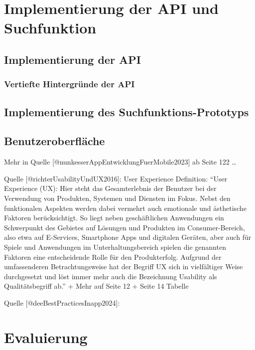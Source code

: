 \documentclass[
  12pt,
  a4paperpaper,
]{report}
\begin{document}
\chapter{Implementierung der API und
Suchfunktion}\label{implementierung-der-api-und-suchfunktion}

\section{Implementierung der API}\label{implementierung-der-api}

\subsection{Vertiefte Hintergründe der
API}\label{vertiefte-hintergruxfcnde-der-api}

\section{Implementierung des
Suchfunktions-Prototyps}\label{implementierung-des-suchfunktions-prototyps}

\section{Benutzeroberfläche}\label{benutzeroberfluxe4che}

Mehr in Quelle {[}@nunkesserAppEntwicklungFuerMobile2023{]} ab Seite 122
\ldots{}

Quelle {[}@richterUsabilityUndUX2016{]}: User Experience Definition:
``User Experience (UX): Hier steht das Gesamterlebnis der Benutzer bei
der Verwendung von Produkten, Systemen und Diensten im Fokus. Nebst den
funktionalen Aspekten werden dabei vermehrt auch emotionale und
ästhetische Faktoren berücksichtigt. So liegt neben geschäftlichen
Anwendungen ein Schwerpunkt des Gebietes auf Lösungen und Produkten im
Consumer-Bereich, also etwa auf E-Services, Smartphone Apps und
digitalen Geräten, aber auch für Spiele und Anwendungen im
Unterhaltungsbereich spielen die genannten Faktoren eine entscheidende
Rolle für den Produkterfolg. Aufgrund der umfassenderen
Betrachtungsweise hat der Begriff UX sich in vielfältiger Weise
durchgesetzt und löst immer mehr auch die Bezeichnung Usability als
Qualitätsbegriff ab.'' + Mehr auf Seite 12 + Seite 14 Tabelle

Quelle {[}@deeBestPracticesInapp2024{]}:

\chapter{Evaluierung}\label{evaluierung}
\end{document}
